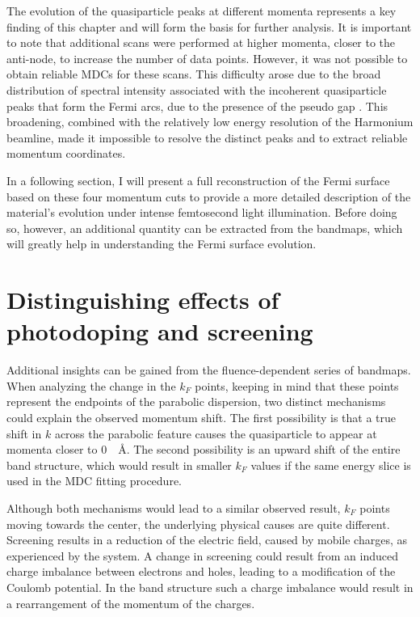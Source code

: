 The evolution of the quasiparticle peaks at different momenta represents a key finding of this chapter and will form the basis for further analysis.
It is important to note that additional scans were performed at higher momenta, closer to the anti-node, to increase the number of data points.
However, it was not possible to obtain reliable MDCs for these scans.
This difficulty arose due to the broad distribution of spectral intensity associated with the incoherent quasiparticle peaks that form the Fermi arcs, due to the presence of the pseudo gap \cite{norman_destruction_1998}.
This broadening, combined with the relatively low energy resolution of the Harmonium beamline, made it impossible to resolve the distinct peaks and to extract reliable momentum coordinates.

In a following section, I will present a full reconstruction of the Fermi surface based on these four momentum cuts to provide a more detailed description of the material’s evolution under intense femtosecond light illumination.
Before doing so, however, an additional quantity can be extracted from the bandmaps, which will greatly help in understanding the Fermi surface evolution.

\section{Distinguishing effects of photodoping and screening}
\label{sec:mu}

Additional insights can be gained from the fluence-dependent series of bandmaps.
When analyzing the change in the $k_F$ points, keeping in mind that these points represent the endpoints of the parabolic dispersion, two distinct mechanisms could explain the observed momentum shift.
The first possibility is that a true shift in $k$ across the parabolic feature causes the quasiparticle to appear at momenta closer to \qty{0}{\per\angstrom}.
The second possibility is an upward shift of the entire band structure, which would result in smaller $k_F$ values if the same energy slice is used in the MDC fitting procedure.

Although both mechanisms would lead to a similar observed result, $k_F$ points moving towards the center, the underlying physical causes are quite different.
Screening results in a reduction of the electric field, caused by mobile charges, as experienced by the system.
A change in screening could result from an induced charge imbalance between electrons and holes, leading to a modification of the Coulomb potential.
In the band structure such a charge imbalance would result in a rearrangement of the momentum of the charges.

